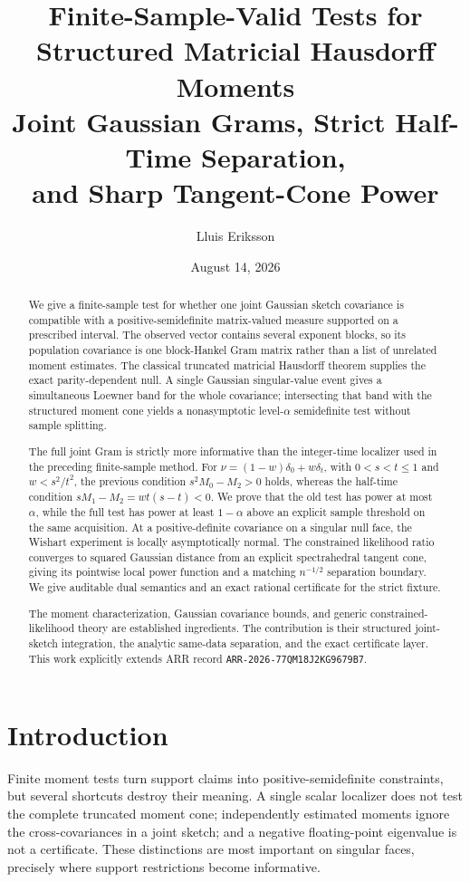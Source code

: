 \documentclass[11pt]{article}
\title{\bfseries Finite-Sample-Valid Tests for Structured Matricial Hausdorff Moments\\[3pt]
\large Joint Gaussian Grams, Strict Half-Time Separation,\\
and Sharp Tangent-Cone Power}
\author{Lluis Eriksson}
\date{August 14, 2026}
\begin{document}
\maketitle

\begin{abstract}
We give a finite-sample test for whether one joint Gaussian sketch covariance
is compatible with a positive-semidefinite matrix-valued measure supported on
a prescribed interval.  The observed vector contains several exponent
blocks, so its population covariance is one block-Hankel Gram matrix rather
than a list of unrelated moment estimates.  The classical truncated
matricial Hausdorff theorem supplies the exact parity-dependent null.
A single Gaussian singular-value event gives a simultaneous Loewner band for
the whole covariance; intersecting that band with the structured moment cone
yields a nonasymptotic level-$\alpha$ semidefinite test without sample
splitting.

The full joint Gram is strictly more informative than the integer-time
localizer used in the preceding finite-sample method.  For
$\nu=(1-w)\delta_0+w\delta_t$, with $0<s<t\le1$ and
$w<s^2/t^2$, the previous condition $s^2M_0-M_2>0$ holds,
whereas the half-time condition $sM_1-M_2=wt(s-t)<0$.  We prove that
the old test has power at most $\alpha$, while the full test has power at
least $1-\alpha$ above an explicit sample threshold on the same acquisition.
At a positive-definite covariance on a singular null face, the Wishart
experiment is locally asymptotically normal.  The constrained likelihood
ratio converges to squared Gaussian distance from an explicit spectrahedral
tangent cone, giving its pointwise local power function and a matching
$n^{-1/2}$ separation boundary.  We give auditable dual semantics and an
exact rational certificate for the strict fixture.

The moment characterization, Gaussian covariance bounds, and generic
constrained-likelihood theory are established ingredients.  The contribution
is their structured joint-sketch integration, the analytic same-data
separation, and the exact certificate layer.  This work explicitly extends
ARR record \texttt{ARR-2026-77QM18J2KG9679B7}.
\end{abstract}

\section{Introduction}

Finite moment tests turn support claims into positive-semidefinite
constraints, but several shortcuts destroy their meaning.  A single scalar
localizer does not test the complete truncated moment cone; independently
estimated moments ignore the cross-covariances in a joint sketch; and a
negative floating-point eigenvalue is not a certificate.  These distinctions
are most important on singular faces, precisely where support restrictions
become informative.
\end{document}
